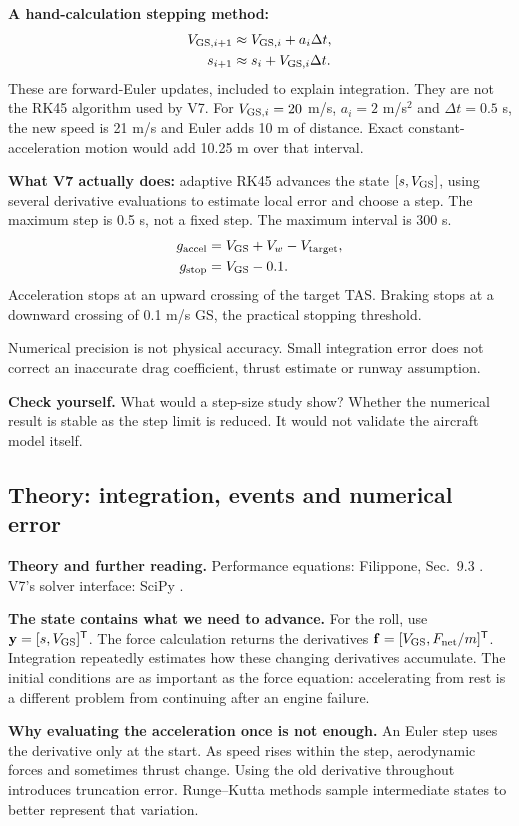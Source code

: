 \documentclass[11pt,letterpaper]{article}
\newcommand{\theorypage}[1]{\clearpage\subsection*{\color{navy}\thesection\enspace Theory: #1}}
\newcommand{\reading}[1]{{\small\color{navy}\textbf{Theory and further reading.} #1\par}\vspace{3pt}}
\newcommand{\selfcheck}[1]{\par\textbf{Check yourself.} #1\par}
\begin{document}
\textbf{A hand-calculation stepping method:}
\begin{align*}
V_{{\rm GS},i+1}&\approx V_{{\rm GS},i}+a_i\Delta t,\\
s_{i+1}&\approx s_i+V_{{\rm GS},i}\Delta t.
\end{align*}
These are forward-Euler updates, included to explain integration. They are not
the RK45 algorithm used by V7. For $V_{{\rm GS},i}=20$ m/s, $a_i=2$ m/s$^2$ and
$\Delta t=0.5$ s, the new speed is 21 m/s and Euler adds 10 m of distance.
Exact constant-acceleration motion would add 10.25 m over that interval.

\textbf{What V7 actually does:} adaptive RK45 advances the state $[s,V_{\rm GS}]$,
using several derivative evaluations to estimate local error and choose a step.
The maximum step is 0.5 s, not a fixed step. The maximum interval is 300 s.
\begin{align*}
g_{\rm accel}&=V_{\rm GS}+V_w-V_{\rm target},\\
g_{\rm stop}&=V_{\rm GS}-0.1.
\end{align*}
Acceleration stops at an upward crossing of the target TAS. Braking stops at a
downward crossing of 0.1 m/s GS, the practical stopping threshold.
\begin{keyidea}
Numerical precision is not physical accuracy. Small integration error does not
correct an inaccurate drag coefficient, thrust estimate or runway assumption.
\end{keyidea}
\selfcheck{What would a step-size study show? Whether the numerical result is stable
as the step limit is reduced. It would not validate the aircraft model itself.}


\theorypage{integration, events and numerical error}
\reading{Performance equations: Filippone, Sec.~9.3 \cite{filippone}. V7's solver interface: SciPy \cite{scipy-ivp,scipy-brent}.}
\textbf{The state contains what we need to advance.}
For the roll, use $\mathbf y=[s,V_{\rm GS}]^{\mathsf T}$. The force calculation
returns the derivatives $\mathbf f=[V_{\rm GS},F_{\rm net}/m]^{\mathsf T}$.
Integration repeatedly estimates how these changing derivatives accumulate.
The initial conditions are as important as the force equation: accelerating
from rest is a different problem from continuing after an engine failure.

\textbf{Why evaluating the acceleration once is not enough.}
An Euler step uses the derivative only at the start. As speed rises within the
step, aerodynamic forces and sometimes thrust change. Using the old derivative
throughout introduces truncation error. Runge--Kutta methods sample intermediate
states to better represent that variation.
\end{document}
